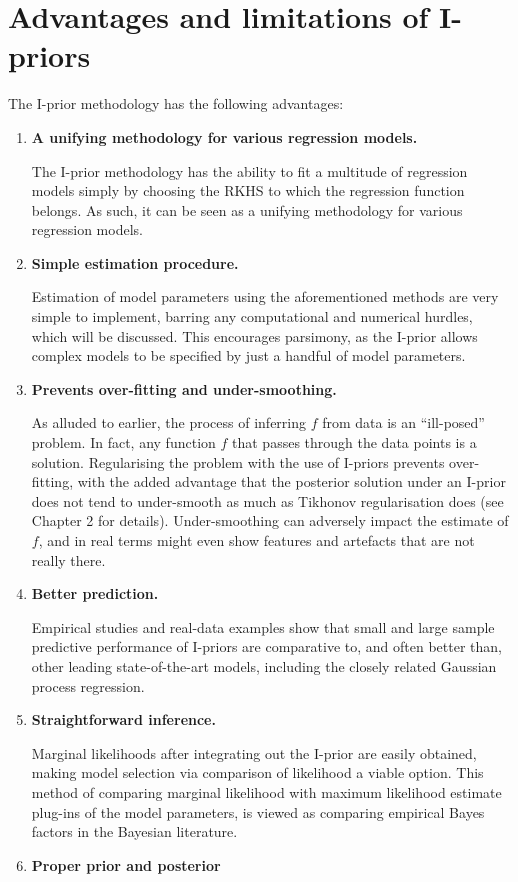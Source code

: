 \documentclass[a4paper,showframe,11pt]{report}
\begin{document}
\section{Advantages and limitations of I-priors}

The I-prior methodology has the following advantages:

\begin{enumerate}
  \item \textbf{A unifying methodology for various regression models.}
  
  The I-prior methodology has the ability to fit a multitude of regression models simply by choosing the RKHS to which the regression function belongs.
  As such, it can be seen as a unifying methodology for various regression models. 
  
  \item \textbf{Simple estimation procedure.}
  
  Estimation of model parameters using the aforementioned methods are very simple to implement, barring any computational and numerical hurdles, which will be discussed.
  This encourages parsimony, as the I-prior allows complex models to be specified by just a handful of model parameters.
  
  \item \textbf{Prevents over-fitting and under-smoothing.}
  
  As alluded to earlier, the process of inferring $f$ from data is an ``ill-posed'' problem.
  In fact, any function $f$ that passes through the data points is a solution.
  Regularising the problem with the use of I-priors prevents over-fitting, with the added advantage that the posterior solution under an I-prior does not tend to under-smooth as much as Tikhonov regularisation does (see Chapter 2 for details).
  Under-smoothing can adversely impact the estimate of $f$, and in real terms might even show features and artefacts that are not really there.
  
  \item \textbf{Better prediction.}
  
  Empirical studies and real-data examples show that small and large sample predictive performance of I-priors are comparative to, and often better than, other leading state-of-the-art models, including the closely related Gaussian process regression.

  \item \textbf{Straightforward inference.}
  
  Marginal likelihoods after integrating out the I-prior are easily obtained, making model selection via comparison of likelihood a viable option.
  This method of comparing marginal likelihood with maximum likelihood estimate plug-ins of the model parameters, is viewed as comparing empirical Bayes factors in the Bayesian literature.
  
  \item \textbf{Proper prior and posterior}
  
  
\end{enumerate}
\end{document}
